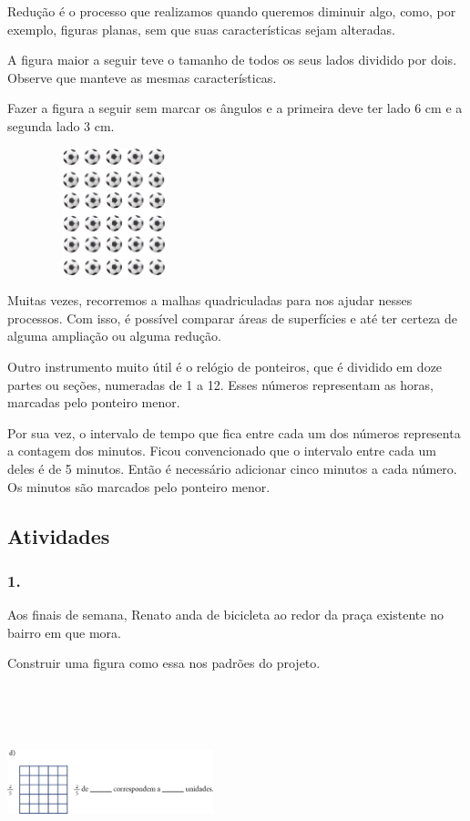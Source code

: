 \begin{enumerate}
\begin{escolha}
\begin{enumerate}
\begin{itemize}
\begin{itemize}
\begin{escolha}
Redução é o processo que realizamos quando queremos diminuir algo,
como, por exemplo, figuras planas, sem que suas características
sejam alteradas.

A figura maior a seguir teve o tamanho de todos os seus lados dividido por dois. Observe que manteve as
mesmas características.

Fazer a figura a seguir sem marcar os ângulos e a primeira deve ter lado
6 cm e a segunda lado 3 cm.

\includegraphics[width=2.44231in,height=1.44820in]{media/image57.png}

Muitas vezes, recorremos a malhas quadriculadas para nos
ajudar nesses processos. Com isso, é possível comparar áreas de
superfícies e até ter certeza de alguma ampliação ou alguma redução.

Outro instrumento muito útil é o relógio de ponteiros, que é dividido em doze partes ou
seções, numeradas de 1 a 12. Esses números representam as horas, marcadas pelo ponteiro menor.

Por sua vez, o intervalo de tempo que fica entre cada um dos números
representa a contagem dos minutos. Ficou convencionado que o
intervalo entre cada um deles é de 5 minutos. Então é necessário adicionar cinco minutos a cada número. Os minutos são marcados pelo ponteiro menor.

\subsection{Atividades}\label{atividades-4}

\subsubsection{1.}\label{section-52}

Aos finais de semana, Renato anda de bicicleta ao redor da praça
existente no bairro em que mora.

Construir uma figura como essa nos padrões do projeto.

\includegraphics[width=2.35256in,height=2.20730in]{media/image61.png}


\end{escolha}
\end{itemize}
\end{itemize}
\end{enumerate}
\end{escolha}
\end{enumerate}
